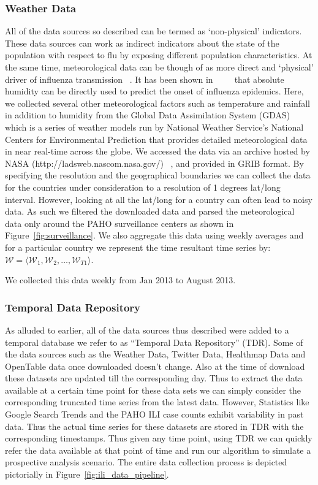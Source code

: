 \subsubsection{Weather Data} 
All of the data sources so described can be termed as `non-physical'
indicators. These data sources can work as indirect indicators about the
state of the population with respect to flu by exposing different
population characteristics. At the same time, meteorological data can be
though of as more direct and `physical' driver of influenza transmission
~\cite{flu_humidity_physical}. It has been shown in~\cite{Shaman_orig_humidity_link} 
~\cite{Shaman_humidity_USA} ~\cite{ref9} that absolute humidity can be directly used to
predict the onset of influenza epidemics. Here, we collected several other
meteorological factors such as temperature and rainfall in addition to
humidity from the Global Data Assimilation System (GDAS) which is 
a series of weather models run by National Weather Service's National 
Centers for Environmental Prediction that provides detailed meteorological 
data in near real-time across the globe.  We accessed the data via an archive hosted by 
NASA (http://ladsweb.nascom.nasa.gov/) ~\cite{HD:2013}, and provided
in GRIB format. By specifying the resolution and the geographical
boundaries we can collect the data for the countries under consideration
to a resolution of 1 degrees lat/long interval. However, looking at all
the lat/long for a country can often lead to noisy data. As such we
filtered the downloaded data and parsed the meteorological data only around
the PAHO surveillance centers as shown in
Figure~\ref{fig:surveillance}. We also aggregate this data using weekly
averages and for a particular country we represent the time resultant
time series by:
$\mathcal{W} = \langle \mathcal{W}_1, \mathcal{W}_2, \dots, \mathcal{W}_{T1} \rangle$.

We collected this data weekly from Jan 2013 to August 2013. 


\subsubsection{Temporal Data Repository}
As alluded to earlier, all of the data sources thus described were added to a temporal database
we refer to as ``Temporal Data Repository'' (TDR). Some of the data
sources such as the Weather Data, Twitter Data, Healthmap Data and
OpenTable data once downloaded doesn't change. Also at the time of
download these datasets are updated till the corresponding day. 
Thus to extract the data available at a certain time point for these
data sets we can simply consider the corresponding truncated time series
from the latest data. However, Statistics like Google Search Trends and
the PAHO ILI case counts exhibit variability in past data. Thus the
actual time series for these datasets are stored in TDR with the
corresponding timestamps. Thus given any time point, using TDR we can
quickly refer the data available at that point of time and run our
algorithm to simulate a prospective analysis scenario. 
The entire data collection process is depicted
pictorially in Figure~\ref{fig:ili_data_pipeline}.
